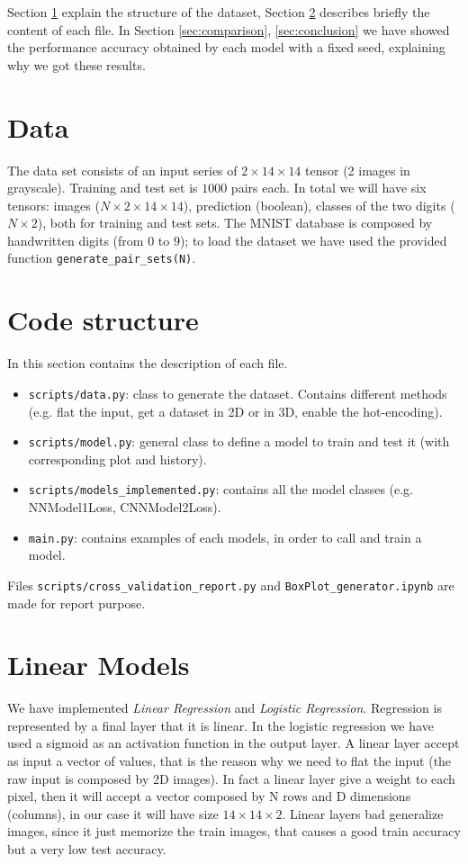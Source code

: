 \documentclass[journal, a4paper]{IEEEtran}
\begin{document}
Section \ref{sec:data} explain the structure of the dataset, Section \ref{sec:codestruc} describes briefly the content of each file. In Section \ref{sec:comparison}, \ref{sec:conclusion} we have showed the performance accuracy obtained by each model with a fixed seed, explaining why we got these results.


\section{Data}
\label{sec:data}
The data set consists of an input series of $2\times14\times14$ tensor (2 images in grayscale). Training and test set is $1000$ pairs each. In total we will have six tensors: images ($N\times2\times14\times14$), prediction (boolean), classes of the two digits ($N\times2$), both for training and test sets. The MNIST database is composed by handwritten digits (from $0$ to $9$); to load the dataset we have used the provided function \texttt{generate\_pair\_sets(N)}.

\section{Code structure}
\label{sec:codestruc}
In this section contains the description of each file.
\begin{itemize}
    \item \texttt{scripts/data.py}: class to generate the dataset. Contains different methods (e.g. flat the input, get a dataset in 2D or in 3D, enable the hot-encoding).
    \item \texttt{scripts/model.py}: general class to define a model to train and test it (with corresponding plot and history).
    \item \texttt{scripts/models\_implemented.py}: contains all the model classes (e.g. NNModel1Loss, CNNModel2Loss).
    \item \texttt{main.py}: contains examples of each models, in order to call and train a model.
\end{itemize}
Files \texttt{scripts/cross\_validation\_report.py} and \texttt{BoxPlot\_generator.ipynb} are made for report purpose.

\section{Linear Models}
\label{sec:linearmodel}
We have implemented \textit{Linear Regression} and \textit{Logistic Regression}. Regression is represented by a final layer that it is linear. In the logistic regression we have used a sigmoid as an activation function in the output layer. A linear layer accept as input a vector of values, that is the reason why we need to flat the input (the raw input is composed by 2D images). In fact a linear layer give a weight to each pixel, then it will accept a vector composed by N rows and D dimensions (columns), in our case it will have size $14 \times 14 \times 2$. Linear layers bad generalize images, since it just memorize the train images, that causes a good train accuracy but a very low test accuracy.
\end{document}
